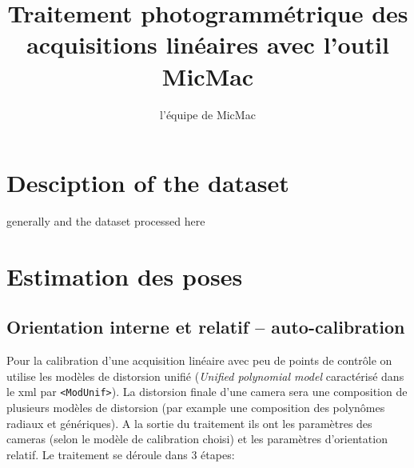 \documentclass[11pt,a4paper,oneside]{book}
\author{l'équipe de MicMac}
\title{Traitement photogrammétrique des acquisitions linéaires avec l'outil MicMac}
\begin{document}
\maketitle
\tableofcontents
\chapter{Desciption of the dataset}
generally and the dataset processed here

\chapter{Estimation des poses}

\section{Orientation interne et relatif -- auto-calibration}\label{sec:oriRel}
Pour la calibration d'une acquisition linéaire avec peu de points de contrôle on utilise les modèles de distorsion unifié (\textit{Unified polynomial model} caractérisé dans le xml par {\tt <ModUnif>}). 
La distorsion finale d'une camera sera une composition de plusieurs modèles de distorsion (par example une composition des polynômes radiaux et génériques). A la sortie du traitement ils ont les paramètres des cameras (selon le modèle de calibration choisi) et les paramètres d'orientation relatif. Le traitement se déroule dans 3 étapes:
%
\end{document}
